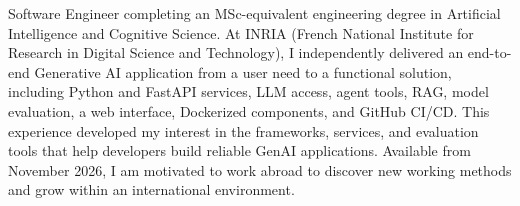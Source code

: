
\begin{cvparagraph}
Software Engineer completing an MSc-equivalent engineering degree in Artificial Intelligence and Cognitive Science. At INRIA (French National Institute for Research in Digital Science and Technology), I independently delivered an end-to-end Generative AI application from a user need to a functional solution, including Python and FastAPI services, LLM access, agent tools, RAG, model evaluation, a web interface, Dockerized components, and GitHub CI/CD. This experience developed my interest in the frameworks, services, and evaluation tools that help developers build reliable GenAI applications. Available from November 2026, I am motivated to work abroad to discover new working methods and grow within an international environment.
\end{cvparagraph}
